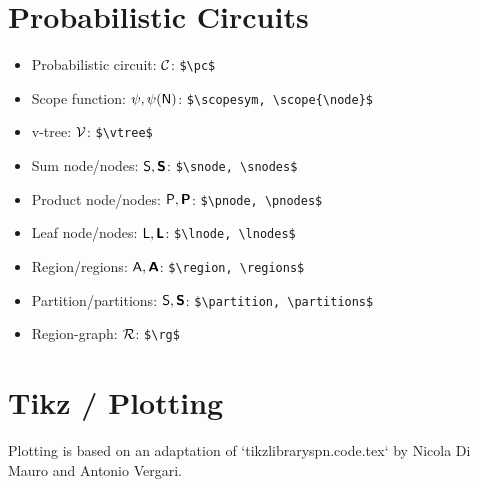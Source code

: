 \documentclass[11pt]{article}
\begin{document}
\section{Probabilistic Circuits}
\begin{itemize}
	\item Probabilistic circuit: $\mathcal{C}$: \verb!$\pc$!
	\item Scope function: $\psi, \psi(\mathsf{N})$: \verb!$\scopesym, \scope{\node}$!
	\item v-tree: $\mathcal{V}$: \verb!$\vtree$!
	\item Sum node/nodes: $\mathsf{S}, \bm{\mathsf{S}}$: \verb!$\snode, \snodes$!
	\item Product node/nodes: $\mathsf{P}, \bm{\mathsf{P}}$: \verb!$\pnode, \pnodes$!
	\item Leaf node/nodes: $\mathsf{L}, \bm{\mathsf{L}}$: \verb!$\lnode, \lnodes$!
	\item Region/regions: $\mathsf{A}, \bm{\mathsf{A}}$: \verb!$\region, \regions$!
	\item Partition/partitions: $\mathsf{S}, \bm{\mathsf{S}}$: \verb!$\partition, \partitions$!
	\item Region-graph: $\mathcal{R}$: \verb!$\rg$!
\end{itemize}

\section{Tikz / Plotting}
Plotting is based on an adaptation of `tikzlibraryspn.code.tex` by Nicola Di Mauro and Antonio Vergari.

\begin{figure}[h!]
\centering
{}
\end{figure}
\end{document}
